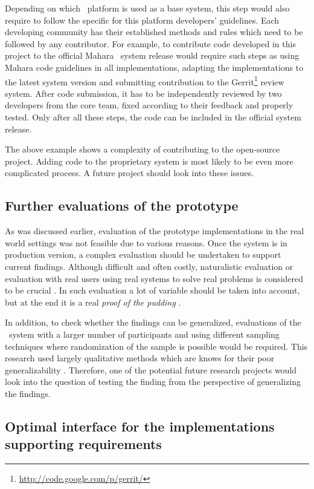 Depending on which \ep~platform is used as a base system, this step would also
require to follow the specific for this platform developers' guidelines. Each
developing community has their established methods and rules which need to be
followed by any contributor. For example, to contribute code developed in this
project to the official Mahara \ep~system release would require such steps as
using Mahara code guidelines in all implementations, adapting the
implementations to the latest system version and submitting contribution to the
Gerrit\footnote{\url{http://code.google.com/p/gerrit/}} review system. After
code submission, it has to be independently reviewed by two developers from the
core team, fixed according to their feedback and properly tested. Only after all
these steps, the code can be included in the official system release.

The above example shows a complexity of contributing to the open-source project.
Adding code to the proprietary system is most likely to be even more complicated
process. A future project should look into these issues.

\subsection{Further evaluations of the prototype}
As was discussed earlier, evaluation of the prototype implementations in the
real world settings was not feasible due to various reasons. Once the system is
in production version, a complex evaluation should be undertaken to support
current findings. Although difficult and often costly, naturalistic evaluation
or evaluation with real users using real systems to solve real problems is
considered to be crucial \citep{Pries-Heje2008}. In such evaluation a lot of
variable should be taken into account, but at the end it is a real \textit{proof
of the pudding} \citep{Venable2010}.

In addition, to check whether the findings can be generalized, evaluations of
the \ep~system with a larger number of participants and using different sampling
techniques where randomization of the sample is possible would be required. This
research used largely qualitative methods which are knows for their poor
generalizability \citep{Trochim2001}. Therefore, one of the potential future
research projects would look into the question of testing the finding from the
perspective of generalizing the findings.

\subsection[Optimal interface design]{Optimal interface for the implementations
supporting \LLLs requirements} 

